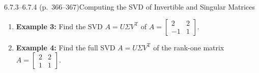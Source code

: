 \documentclass[11pt,a4paper,openany,oneside]{book}
\newcommand{\T}{\mathrm{T}}
\numberwithin{equation}{chapter}
\begin{document}
\begin{example}{6.7.3--6.7.4 (p.\ 366--367)}{Computing the SVD of Invertible and Singular Matrices}
\begin{enumerate}
\item \textbf{Example 3:} Find the SVD $A = U\Sigma V^\T$ of $A = \begin{bmatrix}2 & 2\\-1 & 1\end{bmatrix}$.
\item \textbf{Example 4:} Find the full SVD $A = U\Sigma V^\T$ of the rank-one matrix $A = \begin{bmatrix}2 & 2\\1 & 1\end{bmatrix}$.
\end{enumerate}
\end{example}
\end{document}
